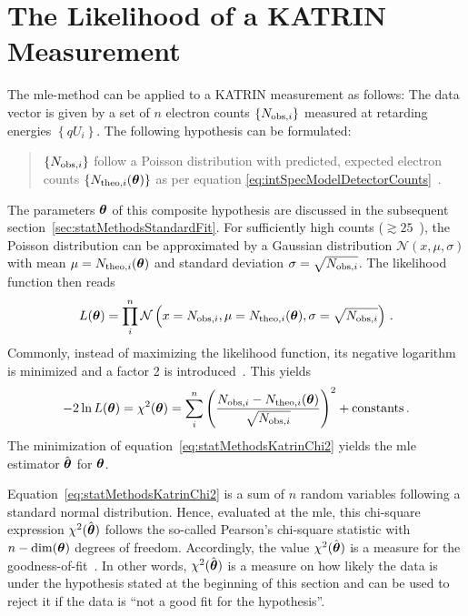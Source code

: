 \section{The Likelihood of a KATRIN Measurement}
\label{sec:statMethodsKATRINLikelihood}
The \gls{mle}-method can be applied to a KATRIN measurement as follows: The data vector is given by a set of $n$ electron counts $\left\{N_{\mathrm{obs,}i}\right\}$ measured at retarding energies $\left\{qU_i\right\}$. The following hypothesis can be formulated:

\begin{quote}
	$\left\{N_{\mathrm{obs,}i}\right\}$ follow a Poisson distribution with predicted, expected electron counts $\left\{N_{\mathrm{theo,}i}(\boldsymbol{\mathbf{\theta}})\right\}$ as per equation \eqref{eq:intSpecModelDetectorCounts}~\cite{Kleesiek2014}.
\end{quote}
The parameters $\boldsymbol{\mathbf{\theta}}$ of this composite hypothesis are discussed in the subsequent section~\ref{sec:statMethodsStandardFit}. For sufficiently high counts ($\gtrsim25$~\cite{Kleesiek2019}), the Poisson distribution can be approximated by a Gaussian distribution $\mathcal{N}(x,\mu, \sigma)$ with mean $\mu=N_{\mathrm{theo,}i}(\boldsymbol{\mathbf{\theta}})$ and standard deviation $\sigma=\sqrt{N_{\mathrm{obs,}i}}$. The likelihood function then reads~\cite{Kleesiek2014}
\begin{equation}
	\label{eq:KATRINlikelihood}
	L(\boldsymbol{\mathbf{\theta}}) = \prod_{i}^{n} \mathcal{N}\left(
		x=N_{\mathrm{obs,}i},
		\mu=N_{\mathrm{theo,}i}(\boldsymbol{\mathbf{\theta}}),
		\sigma=\sqrt{N_{\mathrm{obs,}i}}
	\right)
	\text{\,.}
\end{equation}
Commonly, instead of maximizing the likelihood function, its negative logarithm is minimized and a factor 2 is introduced~\cite{ReviewOfParticlePhysics}. This yields
\begin{equation}
	\label{eq:statMethodsKatrinChi2}
	-2\ln L(\boldsymbol{\mathbf{\theta}}) = \chi^2(\boldsymbol{\mathbf{\theta}}) = \sum_i^n
		\left( 
			\frac{N_{\mathrm{obs,}i}-N_{\mathrm{theo,}i}(\boldsymbol{\mathbf{\theta}})}{\sqrt{N_{\mathrm{obs,}i}}}
		\right)^2
		 + \mathrm{constants}
		\text{\,.}
\end{equation}
The minimization of equation~\eqref{eq:statMethodsKatrinChi2} yields the \gls{mle} estimator $\hat{\boldsymbol{\mathbf{\theta}}}$ for $\boldsymbol{\mathbf{\theta}}$.

Equation~\eqref{eq:statMethodsKatrinChi2} is a sum of $n$ random variables following a standard normal distribution. Hence, evaluated at the \gls{mle}, this chi-square expression $\chi^2(\hat{\boldsymbol{\mathbf{\theta}}})$ follows the so-called Pearson's chi-square statistic with $n-\mathrm{dim}(\boldsymbol{\mathbf{\theta}})$ degrees of freedom. Accordingly, the value $\chi^2(\hat{\boldsymbol{\mathbf{\theta}}})$ is a measure for the goodness-of-fit~\cite{ReviewOfParticlePhysics}. In other words, $\chi^2(\hat{\boldsymbol{\mathbf{\theta}}})$ is a measure on how likely the data is under the hypothesis stated at the beginning of this section and can be used to reject it if the data is ``not a good fit for the hypothesis''.

